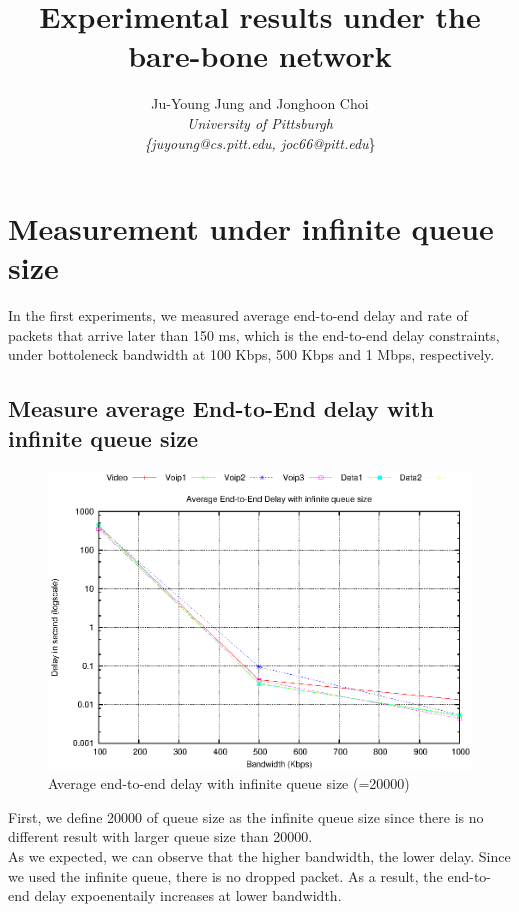\documentclass[letterpaper, 10 pt, conference]{ieeeconf}  %
\title{\LARGE \bf
Experimental results under the bare-bone network
}
\author{Ju-Young Jung and Jonghoon Choi%
	\\\textit{University of Pittsburgh}%
	\\\textit{\{juyoung@cs.pitt.edu, joc66@pitt.edu}\}
}
\begin{document}
\maketitle
\thispagestyle{plain}
\pagestyle{plain}


\section{Measurement under infinite queue size}
\label{sec:exp1}
\noindent 
In the first experiments, we measured average end-to-end delay and rate of packets
that arrive later than 150 ms, which is the end-to-end delay constraints, 
under bottoleneck bandwidth at 100 Kbps, 500 Kbps and 1 Mbps, respectively.\\

\subsection{\bf{Measure average End-to-End delay with infinite queue size}}
\label{sec:EEDdelay_Inf}

\begin{figure}[t]
\centering
\includegraphics{./graphs/AvgEED.eps}
\caption{
Average end-to-end delay with infinite queue size (=20000)
}
\label{fig:AvgEED}
\end{figure}

\noindent
First, we define 20000 of queue size as the infinite queue size since there is no different
result with larger queue size than 20000.\\

As we expected, we can observe that the higher bandwidth, the lower delay.
Since we used the infinite queue, there is no dropped packet.
As a result, the end-to-end delay expoenentaily increases at lower bandwidth.
\end{document}
